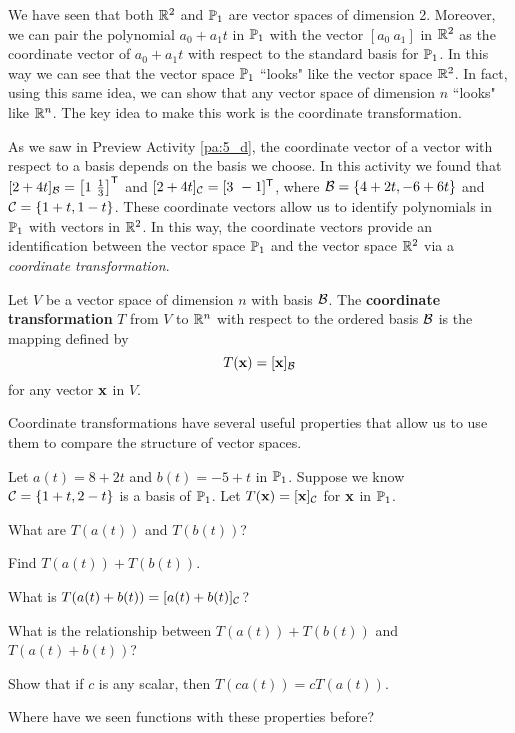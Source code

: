 
We have seen that both $\mathbb{R}^2$ and $\mathbb{P}_1$ are vector spaces of dimension 2. Moreover, we can pair the polynomial $a_0+a_1t$ in $\mathbb{P}_1$ with the vector $[a_0 \ a_1]$ in $\mathbb{R}^2$ as the coordinate vector of $a_0+a_1t$ with respect to the standard basis for $\mathbb{P}_1$. In this way we can see that the vector space $\mathbb{P}_1$ ``looks" like the vector space $\mathbb{R}^2$. In fact, using this same idea, we can show that any vector space of dimension $n$ ``looks" like $\mathbb{R}^n$. The key idea to make this work is the coordinate transformation. 

As we saw in Preview Activity \ref{pa:5_d}, the coordinate vector of a vector with respect to a basis depends on the basis we choose. In this activity we found that $[2+4t]_{\mathcal{B}} = \left[ 1 \ \frac{1}{3} \right]^{\mathsf{T}}$ and $[2+4t]_{\mathcal{C}} = [ 3 \ -1]^{\mathsf{T}}$, where $\mathcal{B} = \{4+2t, -6+6t\}$ and $\mathcal{C} = \{1+t, 1-t\}$. These coordinate vectors allow us to identify polynomials in $\mathbb{P}_1$ with vectors in $\mathbb{R}^2$. In this way, the coordinate vectors provide an identification between the vector space $\mathbb{P}_1$ and the vector space  $\mathbb{R}^2$ via a \emph{coordinate transformation}. 

\begin{definition} Let $V$ be a vector space of dimension $n$ with basis $\mathcal{B}$. The \textbf{coordinate transformation} $T$ from $V$ to $\mathbb{R}^n$ with respect to the ordered basis $\mathcal{B}$ is the mapping defined by 
\[T(\mathbf{x}) = [\mathbf{x}]_{\mathcal{B}}\]
for any vector $\mathbf{x}$ in $V$. 
\end{definition}

Coordinate transformations have several useful properties that allow us to use them to compare the structure of vector spaces. 

\begin{activity} \label{act:5_d_2} Let $a(t) = 8+2t$ and $b(t) = -5+t$ in $\mathbb{P}_1$. Suppose we know $\mathcal{C} =  \{1 + t, 2 - t\}$ is a basis of $\mathbb{P}_1$. Let $T(\mathbf{x})=[\mathbf{x}]_{\mathcal{C}}$ for $\mathbf{x}$ in $\mathbb{P}_1$.  
\ba
\item What are $T(a(t))$ and $T(b(t))$?

	\item Find $T(a(t)) + T(b(t))$.

	\item What is $T(a(t)+b(t))= [a(t)+b(t)]_{\mathcal{C}}$?

	\item What is the relationship between $T(a(t)) + T(b(t))$ and $T(a(t)+b(t))$?


	\item Show that if $c$ is any scalar, then $T(ca(t)) = cT(a(t))$.

	\item Where have we seen functions with these properties before? 
	
\ea

\end{activity}

